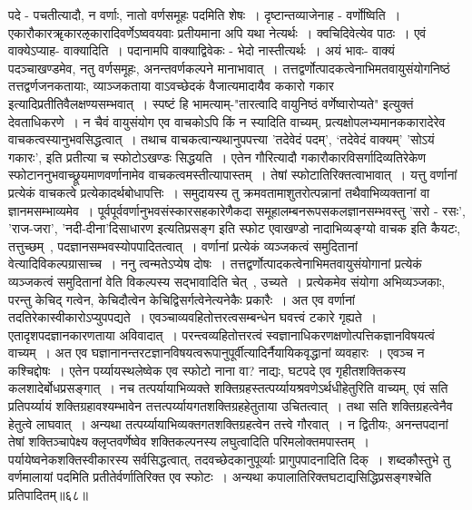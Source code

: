 {{{{ पदे - पचतीत्यादौ, न वर्णाः, नातो वर्णसमूहः पदमिति शेषः~।
दृष्टान्तव्याजेनाह - वर्णोष्विति~।
एकारौकारॠकारऌकारादिवर्णेऽष्ववयवाः प्रतीयमाना अपि यथा नेत्यर्थः~।
क्वचिदिवेत्येव पाठः~।
एवं वाक्येऽप्याह- वाक्यादिति~।
पदानामपि वाक्याद्विवेकः - भेदो नास्तीत्यर्थः~।
अयं भावः- वाक्यं पदञ्चाखण्डमेव, नतु वर्णसमूहः, अनन्तवर्णकल्पने मानाभावात्~।
तत्तद्वर्णोत्पादकत्वेनाभिमतवायुसंयोगनिष्ठं तत्तद्वर्णजनकतायाः, व्याञ्जकताया वाऽवच्छेदकं वैजात्यमादायैव ककारो गकार इत्यादिप्रतीतिवैलक्षण्यसम्भवात्~।
स्पष्टं हि भामत्याम्-"तारत्वादि वायुनिष्ठं वर्णेष्वारोप्यते" इत्युक्तं देवताधिकरणे~।
न चैवं वायुसंयोग एव वाचकोऽपि किं न स्यादिति वाच्यम्, प्रत्यक्षोपलभ्यमानककारादेरेव वाचकत्वस्यानुभवसिद्धत्वात्~।
तथाच वाचकत्वान्यथानुपपत्त्या 'तदेवेदं पदम्', `तदेवेदं वाक्यम्' 'सोऽयं गकारः', इति प्रतीत्या च स्फोटोऽखण्डः सिद्धयति~।
एतेन गौरित्यादौ गकारौकारविसर्गादिव्यतिरेकेण स्फोटाननुभवाच्छ्रूयमाणवर्णानामेव वाचकत्वमस्तीत्यापास्तम्~।
तेषां स्फोटातिरिक्तत्वाभावात्~।
यत्तु वर्णानां प्रत्येकं वाचकत्वे प्रत्येकादर्थबोधापत्तिः~।
समुदायस्य तु क्रमवतामाशुतरोत्पन्नानां तथैवाभिव्यक्तानां वा ज्ञानमसम्भाव्यमेव~।
पूर्वपूर्ववर्णानुभवसंस्कारसहकारेणैकदा समूहालम्बनरूपसकलज्ञानसम्भवस्तु 'सरो - रसः', 'राज-जरा', 'नदी-दीना'दिसाधारण इत्यतिप्रसङ्ग इति स्फोट एवाखण्डो नादाभिव्यङ्ग्यो वाचक इति कैयटः, तत्तुच्छम्~, पदज्ञानसम्भवस्योपपादितत्वात्~।
वर्णानां प्रत्येकं व्यञ्जकत्वं समुदितानां वेत्यादिविकल्पग्रासाच्च~।
ननु त्वन्मतेऽप्येष दोषः~।
तत्तद्वर्णोत्पादकत्वेनाभिमतवायुसंयोगानां प्रत्येकं व्यञ्जकत्वं समुदितानां वेति विकल्पस्य सद्भावादिति चेत्~, उच्यते~।
प्रत्येकमेव संयोगा अभिव्यञ्जकाः, परन्तु केचिद् गत्वेन, केचिदौत्वेन केचिद्विसर्गत्वेनेत्यनेकैः प्रकारैः~।
अत एव वर्णानां तदतिरेकास्वीकारोऽप्युपपद्यते~।
एवञ्चाव्यवहितोत्तरत्वसम्बन्धेन घवत्त्वं टकारे गृह्यते~।
एतादृशपदज्ञानकारणताया अविवादात्~।
परन्त्वव्यहितोत्तरत्वं स्वज्ञानाधिकरणक्षणोत्पत्तिकज्ञानविषयत्वं वाच्यम्~।
अत एव घज्ञानानन्तरटज्ञानविषयत्वरूपानुपूर्वीत्यादिर्नैयायिकवृद्धानां व्यवहारः~।
एवञ्च न कश्चिद्दोषः~।
एतेन पर्य्यायस्थलेष्वेक एव स्फोटो नाना वा? नाद्यः, घटपदे एव गृहीतशक्तिकस्य कलशादेर्बोधप्रसङ्गात्~। नच तत्पर्यायाभिव्यक्ते शक्तिग्रहस्तत्पर्य्यायश्रवणेऽर्थधीहेतुरिति वाच्यम्, एवं सति प्रतिपर्य्यायं शक्तिग्रहावश्यम्भावेन तत्तत्पर्य्यायगतशक्तिग्रहहेतुताया उचितत्वात्~।
तथा सति शक्तिग्रहत्वेनैव हेतुत्वे लाघवात्~।
अन्यथा तत्पर्य्यायाभिव्यक्तगतशक्तिग्रहत्वेन तत्त्वे गौरवात्~।
न द्वितीयः, अनन्तपदानां तेषां शक्तिञ्चापेक्ष्य क्लृप्तवर्णेष्वेव शक्तिकल्पनस्य लघुत्वादिति परिमलोक्तमपास्तम्~।
पर्यायेष्वनेकशक्तिस्वीकारस्य सर्वसिद्धत्वात्, तदवच्छेदकानुपूर्व्याः प्रागुपपादनादिति दिक्~।
शब्दकौस्तुभे तु वर्णमालायां पदमिति प्रतीतेर्वर्णातिरिक्त एव स्फोटः~।
अन्यथा कपालातिरिक्तघटाद्यसिद्धिप्रसङ्गश्चेति प्रतिपादितम्॥६८॥

}}}}
